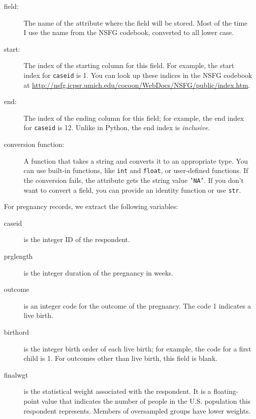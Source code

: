 \documentclass[12pt]{book}
\begin{document}
\begin{description}

\item[field:] The name of the attribute where the field
will be stored.  Most of the time I use the name from the
NSFG codebook, converted to all lower case.

\item[start:] The index of the starting column for this
field.
For example, the start index for {\tt caseid} is 1.
You can look up these indices in the NSFG codebook
at \url{http://nsfg.icpsr.umich.edu/cocoon/WebDocs/NSFG/public/index.htm}.

\item[end:] The index of the ending column for this
field; for example, the end index for {\tt caseid} is 12.
Unlike in Python, the end index is {\em inclusive}.

\item[conversion function:] A function that takes a string
and converts it to an appropriate type.  You can use built-in
functions, like {\tt int} and {\tt float}, or user-defined
functions.  If the conversion fails, the attribute gets the
string value {\tt 'NA'}.  If you don't want to convert a
field, you can provide an identity function or use {\tt str}.

\end{description}

For pregnancy records, we extract the following variables:

\begin{description}

\item[caseid] is the integer ID of the respondent.

\item[prglength] is the integer duration of the pregnancy in weeks.

\item[outcome] is an integer code for the outcome of the pregnancy.
The code 1 indicates a live birth.

\item[birthord] is the integer birth order of each live birth;
for example, the code for a first child is 1. 
For outcomes other than live birth, this field is blank.

\item[finalwgt] is the statistical weight associated with the respondent.
It is a floating-point value that indicates the number of people in
the U.S. population this respondent represents.  Members of oversampled
groups have lower weights.

\end{description}
\end{document}
